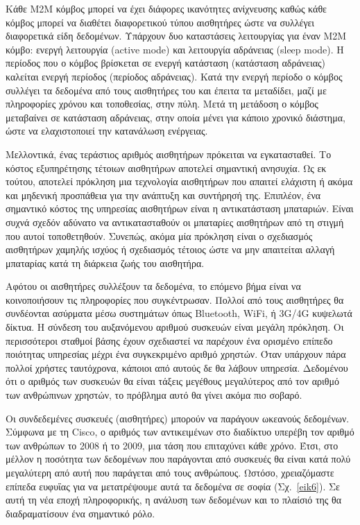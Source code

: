 \documentclass[12pt, a4paper, oneside]{report}
\begin{document}
Κάθε Μ2Μ κόμβος μπορεί να έχει διάφορες ικανότητες ανίχνευσης καθώς κάθε κόμβος μπορεί να διαθέτει διαφορετικού τύπου αισθητήρες ώστε να συλλέγει διαφορετικά είδη δεδομένων. Υπάρχουν δυο καταστάσεις λειτουργίας για έναν Μ2Μ κόμβο: ενεργή λειτουργία (active mode) και λειτουργία αδράνειας (sleep mode). Η περίοδος που ο κόμβος βρίσκεται σε ενεργή κατάσταση (κατάσταση αδράνειας) καλείται ενεργή περίοδος (περίοδος αδράνειας). Κατά την ενεργή περίοδο ο κόμβος συλλέγει τα δεδομένα από τους αισθητήρες του και έπειτα τα μεταδίδει, μαζί με πληροφορίες χρόνου και τοποθεσίας, στην πύλη. Μετά τη μετάδοση ο κόμβος μεταβαίνει σε κατάσταση αδράνειας, στην οποία μένει για κάποιο χρονικό διάστημα, ώστε να ελαχιστοποιεί την κατανάλωση ενέργειας.

Μελλοντικά, ένας τεράστιος αριθμός αισθητήρων πρόκειται να εγκατασταθεί. Το κόστος εξυπηρέτησης τέτοιων αισθητήρων αποτελεί σημαντική ανησυχία. Ως εκ τούτου, αποτελεί πρόκληση μια τεχνολογία αισθητήρων που απαιτεί ελάχιστη ή ακόμα και μηδενική προσπάθεια για την ανάπτυξη και συντήρησή της. Επιπλέον, ένα σημαντικό κόστος της υπηρεσίας αισθητήρων είναι η αντικατάσταση μπαταριών. Είναι συχνά σχεδόν αδύνατο να αντικατασταθούν οι μπαταρίες αισθητήρων από τη στιγμή που αυτοί τοποθετηθούν. Συνεπώς, ακόμα μία πρόκληση είναι ο σχεδιασμός αισθητήρων χαμηλής ισχύος ή σχεδιασμός τέτοιος ώστε να μην απαιτείται αλλαγή μπαταρίας κατά τη διάρκεια ζωής του αισθητήρα.

Αφότου οι αισθητήρες συλλέξουν τα δεδομένα, το επόμενο βήμα είναι να κοινοποιήσουν τις πληροφορίες που συγκέντρωσαν. Πολλοί από τους αισθητήρες θα συνδέονται ασύρματα μέσω συστημάτων όπως Bluetooth, WiFi, ή 3G\slash 4G κυψελωτά δίκτυα. Η σύνδεση του αυξανόμενου αριθμού συσκευών είναι μεγάλη πρόκληση. Οι περισσότεροι σταθμοί βάσης έχουν σχεδιαστεί να παρέχουν ένα ορισμένο επίπεδο ποιότητας υπηρεσίας μέχρι ένα συγκεκριμένο αριθμό χρηστών. Όταν υπάρχουν πάρα πολλοί χρήστες ταυτόχρονα, κάποιοι από αυτούς δε θα λάβουν υπηρεσία. Δεδομένου ότι ο αριθμός των συσκευών θα είναι τάξεις μεγέθους μεγαλύτερος από τον αριθμό των ανθρώπινων χρηστών, το πρόβλημα αυτό θα γίνει ακόμα πιο σοβαρό.

Οι συνδεδεμένες συσκευές (αισθητήρες) μπορούν να παράγουν ωκεανούς δεδομένων. Σύμφωνα με τη Cisco, ο αριθμός των αντικειμένων στο διαδίκτυο υπερέβη τον αριθμό των ανθρώπων το 2008 ή το 2009, μια τάση που επιταχύνει κάθε χρόνο. Έτσι, στο μέλλον η ποσότητα των δεδομένων που παράγονται από συσκευές θα είναι κατά πολύ μεγαλύτερη από αυτή που παράγεται από τους ανθρώπους. Ωστόσο, χρειαζόμαστε επίπεδα ευφυΐας για να μετατρέψουμε αυτά τα δεδομένα σε σοφία (Σχ.~\ref{eik6}). Σε αυτή τη νέα εποχή πληροφορικής, η ανάλυση των δεδομένων και το πλαίσιό της θα διαδραματίσουν ένα σημαντικό ρόλο.
\end{document}
